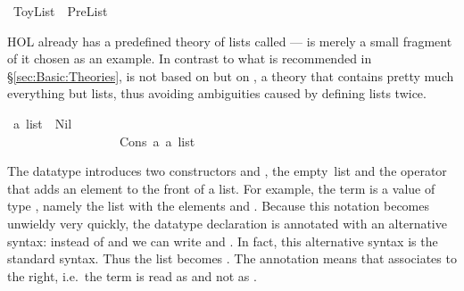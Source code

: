 %
\begin{isabellebody}%
\ ToyList\ {\isacharequal}\ PreList{\isacharcolon}%
\begin{isamarkuptext}%
\noindent
HOL already has a predefined theory of lists called  ---
 is merely a small fragment of it chosen as an example. In
contrast to what is recommended in \S\ref{sec:Basic:Theories},
 is not based on  but on , a
theory that contains pretty much everything but lists, thus avoiding
ambiguities caused by defining lists twice.%
\end{isamarkuptext}%
\ {\isacharprime}a\ list\ {\isacharequal}\ Nil\ \ \ \ \ \ \ \ \ \ \ \ \ \ \ \ \ \ \ \ \ \ \ \ \ \ {\isacharparenleft}{\isachardoublequote}{\isacharbrackleft}{\isacharbrackright}{\isachardoublequote}{\isacharparenright}\isanewline
\ \ \ \ \ \ \ \ \ \ \ \ \ \ \ \ \ {\isacharbar}\ Cons\ {\isacharprime}a\ {\isachardoublequote}{\isacharprime}a\ list{\isachardoublequote}\ \ \ \ \ \ \ \ \ \ \ \ {\isacharparenleft}\ {\isachardoublequote}{\isacharhash}{\isachardoublequote}\ %
\begin{isamarkuptext}%
\noindent
The datatype  introduces two
constructors  and , the
empty~list and the operator that adds an element to the front of a list. For
example, the term  is a value of
type , namely the list with the elements  and
. Because this notation becomes unwieldy very quickly, the
datatype declaration is annotated with an alternative syntax: instead of
 and  we can write
\isa{{\isacharbrackleft}{\isacharbrackright}} and
. In fact, this
alternative syntax is the standard syntax. Thus the list  becomes . The annotation
 means that \isa{{\isacharhash}} associates to
the right, i.e.\ the term  is read as 
and not as .


\end{isamarkuptext}
\end{isabellebody}

